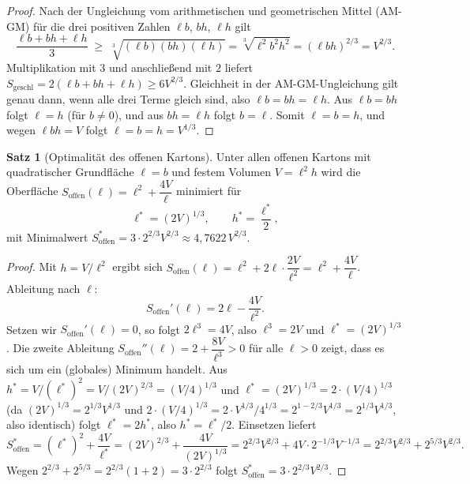 ﻿\documentclass[a4paper,12pt]{article}
\theoremstyle{definition}
\newtheorem{satz}{Satz}
\begin{document}
\begin{proof}
	Nach der Ungleichung vom arithmetischen und geometrischen Mittel (AM-GM) für
	die drei positiven Zahlen $\ell b$, $b h$, $\ell h$ gilt
	\[
		\frac{\ell b + bh + \ell h}{3} \;\geq\; \sqrt[3]{(\ell b)(bh)(\ell h)}
		= \sqrt[3]{\ell^2 b^2 h^2} = (\ell b h)^{2/3} = V^{2/3}.
	\]
	Multiplikation mit $3$ und anschließend mit $2$ liefert
	$S_{\mathrm{geschl}} = 2(\ell b + bh + \ell h) \geq 6V^{2/3}$. Gleichheit in
	der AM-GM-Ungleichung gilt genau dann, wenn alle drei Terme gleich sind, also
	$\ell b = bh = \ell h$. Aus $\ell b = bh$ folgt $\ell = h$ (für $b \neq 0$),
	und aus $bh = \ell h$ folgt $b = \ell$. Somit $\ell = b = h$, und wegen
	$\ell b h = V$ folgt $\ell = b = h = V^{1/3}$.
\end{proof}

\begin{satz}[Optimalität des offenen Kartons]
	\label{satz:offen}
	Unter allen offenen Kartons mit quadratischer Grundfläche $\ell = b$ und
	festem Volumen $V = \ell^2 h$ wird die Oberfläche
	$S_{\mathrm{offen}}(\ell) = \ell^2 + \dfrac{4V}{\ell}$ minimiert für
	\[
		\ell^\ast = (2V)^{1/3}, \qquad h^\ast = \frac{\ell^\ast}{2},
	\]
	mit Minimalwert $S_{\mathrm{offen}}^\ast = 3 \cdot 2^{2/3} V^{2/3} \approx
	4{,}7622 \, V^{2/3}$.
\end{satz}

\begin{proof}
	Mit $h = V/\ell^2$ ergibt sich
	$S_{\mathrm{offen}}(\ell) = \ell^2 + 2\ell \cdot \dfrac{2V}{\ell^2} = \ell^2 +
	\dfrac{4V}{\ell}$. Ableitung nach $\ell$:
	\[
		S_{\mathrm{offen}}'(\ell) = 2\ell - \frac{4V}{\ell^2}.
	\]
	Setzen wir $S_{\mathrm{offen}}'(\ell) = 0$, so folgt $2\ell^3 = 4V$, also
	$\ell^3 = 2V$ und $\ell^\ast = (2V)^{1/3}$. Die zweite Ableitung
	$S_{\mathrm{offen}}''(\ell) = 2 + \dfrac{8V}{\ell^3} > 0$ für alle
	$\ell > 0$ zeigt, dass es sich um ein (globales) Minimum handelt. Aus
	$h^\ast = V/(\ell^\ast)^2 = V/(2V)^{2/3} = (V/4)^{1/3}$ und
	$\ell^\ast = (2V)^{1/3} = 2 \cdot (V/4)^{1/3}$ (da
	$(2V)^{1/3} = 2^{1/3}V^{1/3}$ und $2 \cdot (V/4)^{1/3} = 2 \cdot
	V^{1/3}/4^{1/3} = 2^{1-2/3}V^{1/3} = 2^{1/3}V^{1/3}$, also identisch) folgt
	$\ell^\ast = 2h^\ast$, also $h^\ast = \ell^\ast/2$. Einsetzen liefert
	\[
		S_{\mathrm{offen}}^\ast = (\ell^\ast)^2 + \frac{4V}{\ell^\ast}
		= (2V)^{2/3} + \frac{4V}{(2V)^{1/3}}
		= 2^{2/3}V^{2/3} + 4V \cdot 2^{-1/3}V^{-1/3}
		= 2^{2/3}V^{2/3} + 2^{5/3}V^{2/3}.
	\]
	Wegen $2^{2/3} + 2^{5/3} = 2^{2/3}(1 + 2) = 3 \cdot 2^{2/3}$ folgt
	$S_{\mathrm{offen}}^\ast = 3 \cdot 2^{2/3}V^{2/3}$.
\end{proof}
\end{document}
